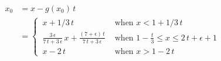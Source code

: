 \documentclass[../main.tex]{subfiles}
\begin{document}
\begin{align}
    x_0 &= x - g(x_0) \, t \nonumber \\
        &= \begin{cases}
              \, x + 1/3 \, t & \text{ when } x < 1 + 1/3 \, t \\
              \, \frac{3 \, \epsilon}{7 \, t + 3 \, \epsilon} \, x + \frac{(7 + \epsilon) \, t}{7 \, t + 3 \, \epsilon} & \text{ when } 1 - \frac{t}{3} \leqslant x \leqslant 2 \, t + \epsilon + 1 \\
              \, x - 2 \, t & \text{ when } x > 1 - 2 \, t
          \end{cases}
\end{align}
\end{document}
